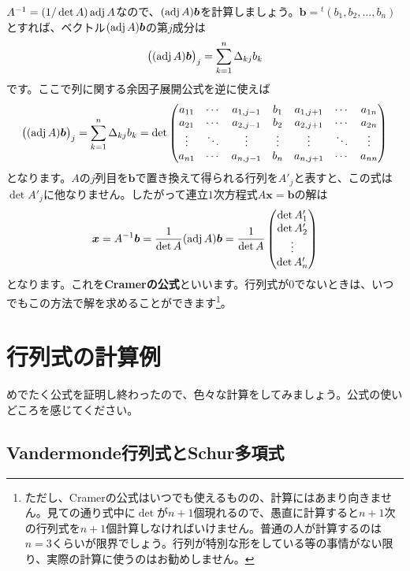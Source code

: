 $A^{-1} = (1 / \det A) \operatorname{adj} A$なので、$(\operatorname{adj} A)\boldsymbol{b}$を計算しましょう。$\bm{b} = {}^t(b_1, b_2, \ldots, b_n)$とすれば、ベクトル$(\operatorname{adj} A)\boldsymbol{b}$の第$j$成分は
\[
\bigl((\operatorname{adj} A) \boldsymbol{b}\bigr)_j = \sum_{k = 1}^n \Delta_{kj} b_k
\]
です。ここで列に関する余因子展開公式を逆に使えば
\[
\bigl((\operatorname{adj} A) \boldsymbol{b}\bigr)_j = \sum_{k = 1}^n \Delta_{kj} b_k
= \det 
\begin{pmatrix}
a_{11} & \cdots & a_{1, j - 1} & b_1 & a_{1, j + 1} & \cdots & a_{1n} \\
a_{21} & \cdots & a_{2, j - 1} & b_2 & a_{2, j + 1} & \cdots & a_{2n} \\
\vdots & \ddots & \vdots & \vdots & \vdots & \ddots & \vdots \\
a_{n1} & \cdots & a_{n, j - 1} & b_n & a_{n, j + 1} & \cdots & a_{nn} \\
\end{pmatrix}
\]
となります。$A$の$j$列目を$\bm{b}$で置き換えて得られる行列を$A'_j$と表すと、この式は$\det A'_j$に他なりません。したがって連立$1$次方程式$A\bm{x} = \bm{b}$の解は
\[
\boldsymbol{x} = A^{-1} \boldsymbol{b} = \frac{1}{\det A} (\operatorname{adj} A) \boldsymbol{b} =
\frac{1}{\det A}
\begin{pmatrix}
\det A'_1 \\
\det A'_2 \\
\vdots \\
\det A'_n
\end{pmatrix}
\]
となります。これを\textbf{Cramerの公式}といいます。行列式が$0$でないときは、いつでもこの方法で解を求めることができます\footnote{ただし、Cramerの公式はいつでも使えるものの、計算にはあまり向きません。見ての通り式中に$\det$が$n + 1$個現れるので、愚直に計算すると$n + 1$次の行列式を$n + 1$個計算しなければいけません。普通の人が計算するのは$n = 3$くらいが限界でしょう。行列が特別な形をしている等の事情がない限り、実際の計算に使うのはお勧めしません。}。

\section{行列式の計算例}

めでたく公式を証明し終わったので、色々な計算をしてみましょう。公式の使いどころを感じてください。

\subsection{Vandermonde行列式とSchur多項式}

